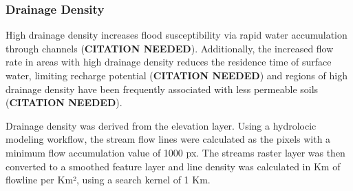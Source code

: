 \documentclass[
]{agujournal2019}
\begin{document}
\subsubsection{Drainage Density}\label{drainage-density}

High drainage density increases flood susceptibility via rapid water
accumulation through channels (\textbf{CITATION NEEDED}). Additionally,
the increased flow rate in areas with high drainage density reduces the
residence time of surface water, limiting recharge potential
(\textbf{CITATION NEEDED}) and regions of high drainage density have
been frequently associated with less permeable soils (\textbf{CITATION
NEEDED}).

Drainage density was derived from the elevation layer. Using a
hydrolocic modeling workflow, the stream flow lines were calculated as
the pixels with a minimum flow accumulation value of 1000 px. The
streams raster layer was then converted to a smoothed feature layer and
line density was calculated in Km of flowline per Km², using a search
kernel of 1 Km.
\end{document}
